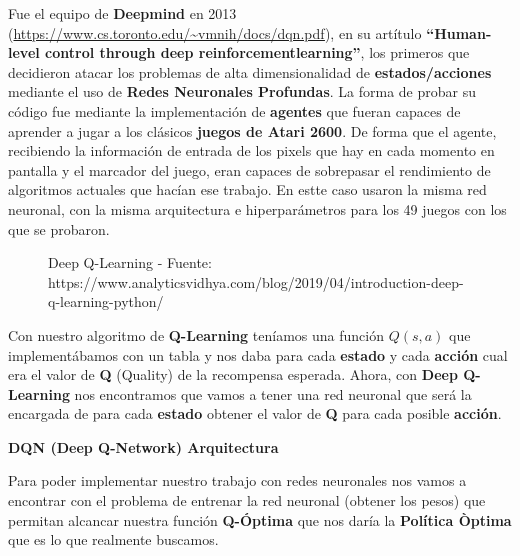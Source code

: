 \documentclass[
  a4paper,
  DIV=11,
  numbers=noendperiod]{scrreprt}
\begin{document}
Fue el equipo de \textbf{Deepmind} en 2013
(\url{https://www.cs.toronto.edu/~vmnih/docs/dqn.pdf}), en su artítulo
\textbf{``Human-level control through deep reinforcementlearning''}, los
primeros que decidieron atacar los problemas de alta dimensionalidad de
\textbf{estados/acciones} mediante el uso de \textbf{Redes Neuronales
Profundas}. La forma de probar su código fue mediante la implementación
de \textbf{agentes} que fueran capaces de aprender a jugar a los
clásicos \textbf{juegos de Atari 2600}. De forma que el agente,
recibiendo la información de entrada de los pixels que hay en cada
momento en pantalla y el marcador del juego, eran capaces de sobrepasar
el rendimiento de algoritmos actuales que hacían ese trabajo. En estte
caso usaron la misma red neuronal, con la misma arquitectura e
hiperparámetros para los 49 juegos con los que se probaron.

\begin{figure}


\caption{\label{fig-rl_dqlearning}Deep Q-Learning - Fuente:
https://www.analyticsvidhya.com/blog/2019/04/introduction-deep-q-learning-python/}

\end{figure}%

Con nuestro algoritmo de \textbf{Q-Learning} teníamos una función
\(Q(s,a)\) que implementábamos con un tabla y nos daba para cada
\textbf{estado} y cada \textbf{acción} cual era el valor de \textbf{Q}
(Quality) de la recompensa esperada. Ahora, con \textbf{Deep Q-Learning}
nos encontramos que vamos a tener una red neuronal que será la encargada
de para cada \textbf{estado} obtener el valor de \textbf{Q} para cada
posible \textbf{acción}.

\textbf{DQN (Deep Q-Network) Arquitectura}

Para poder implementar nuestro trabajo con redes neuronales nos vamos a
encontrar con el problema de entrenar la red neuronal (obtener los
pesos) que permitan alcancar nuestra función \textbf{Q-Óptima} que nos
daría la \textbf{Política Òptima} que es lo que realmente buscamos.
\end{document}
